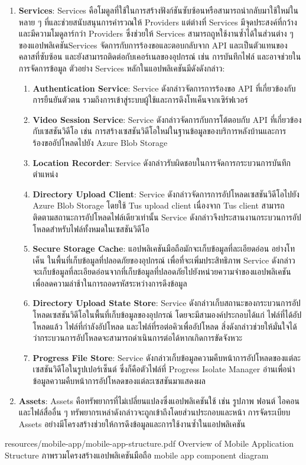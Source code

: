 \begin{enumerate}
    \item \textbf{Services}: Services คือโมดูลที่ใช้ในการสร้างฟังก์ชันซับซ้อนหรือสามารถนำกลับมาใช้ใหม่ในหลาย ๆ ที่และช่วยสนับสนุนการคำรวณให้ Providers แต่ต่างที่ Services มีจุดประสงค์ที่กว้างและมีความโมดูลาร์กว่า Providers ซึ่งช่วยให้ Services สามารถถูหใช้งานซ้ำได้ในส่วนต่าง ๆ ของแอปพลิเคชัน\enskip Services จัดการกับการร้องขอและตอบกลับจาก API และเป็นตัวแทนของคลาสที่ซับซ้อน และยังสามารถติดต่อกับเคอร์เนลของอุปกรณ์ เช่น การบันทึกไฟล์ และอาจช่วยในการจัดการข้อมูล ตัวอย่าง Services หลักในแอปพลิเคชันมีดังดังกล่าว:
    \begin{enumerate}  
        \item \textbf{Authentication Service}: Service ดังกล่าวจัดการการร้องขอ API ที่เกี่ยวข้องกับการยืนยันตัวตน รวมถึงการเข้าสู่ระบบผู้ใช้และการดึงโทเค็นจากเซิร์ฟเวอร์  
        \item \textbf{Video Session Service}: Service ดังกล่าวจัดการกับการโต้ตอบกับ API ที่เกี่ยวข้องกับเซสชันวิดีโอ เช่น การสร้างเซสชันวิดีโอใหม่ในฐานข้อมูลของบริการหลังบ้านและการร้องขออัปโหลดไปยัง Azure Blob Storage  
        \item \textbf{Location Recorder}: Service ดังกล่าวรับผิดชอบในการจัดการกระบวนการบันทึกตำแหน่ง 
        \item \textbf{Directory Upload Client}: Service ดังกล่าวจัดการการอัปโหลดเซสชันวิดีโอไปยัง Azure Blob Storage โดยใช้ Tus upload client เนื่องจาก Tus client สามารถติดตามสถานะการอัปโหลดไฟล์เดียวเท่านั้น Service ดังกล่าวจึงประสานงานกระบวนการอัปโหลดสำหรับไฟล์ทั้งหมดในเซสชันวิดีโอ  
        \item \textbf{Secure Storage Cache}: แอปพลิเคชันมือถือมักจะเก็บข้อมูลที่ละเอียดอ่อน อย่างโทเค็น ในพื้นที่เก็บข้อมูลที่ปลอดภัยของอุปกรณ์ เพื่อที่จะเพิ่มประสิทธิภาพ Service ดังกล่าวจะเก็บข้อมูลที่ละเอียดอ่อนจากที่เก็บข้อมูลที่ปลอดภัยไปยังหน่วยความจำของแอปพลิเคชันเพื่อลดความล่าช้าในการถอดรหัสระหว่างการดึงข้อมูล  
        \item \textbf{Directory Upload State Store}: Service ดังกล่าวเก็บสถานะของกระบวนการอัปโหลดเซสชันวิดีโอในพื้นที่เก็บข้อมูลของอุปกรณ์ โดยจะมีสามองค์ประกอบได้แก่ ไฟล์ที่ได้อัปโหลดแล้ว ไฟล์ที่กำลังอัปโหลด และไฟล์ที่รอต่อคิวเพื่ออัปโหลด สิ่งดังกล่าวช่วยให้มั่นใจได้ว่ากระบวนการอัปโหลดจะสามารถดำเนินการต่อได้หากเกิดการขัดจังหวะ  
        \item \textbf{Progress File Store}: Service ดังกล่าวเก็บข้อมูลความคืบหน้าการอัปโหลดของแต่ละเซสชันวิดีโอในรูปเปอร์เซ็นต์ ซึ่งก็คือตัวไฟล์ที่ Progress Isolate Manager อ่านเพื่อนำข้อมูลความคืบหน้าการอัปโหลดของแต่ละเซสชันมาแสดงผล
    \end{enumerate}  
    
    \item \textbf{Assets}: Assets คือทรัพยากรที่ไม่เปลี่ยนแปลงซึ่งแอปพลิเคชันใช้ เช่น รูปภาพ ฟอนต์ ไอคอน และไฟล์สื่ออื่น ๆ ทรัพยากรเหล่าดังกล่าวจะถูกเข้าถึงโดยส่วนประกอบและหน้า การจัดระเบียบ Assets อย่างมีโครงสร้างช่วยให้การดึงข้อมูลและการใช้งานซ้ำในแอปพลิเคชัน
\end{enumerate}
\fi

\insertPDFfigure
{resources/mobile-app/mobile-app-structure.pdf}
{\ifenglish Overview of Mobile Application Structure \else ภาพรวมโครงสร้างแอปพลิเคชันมือถือ \fi}
{mobile app component diagram}
